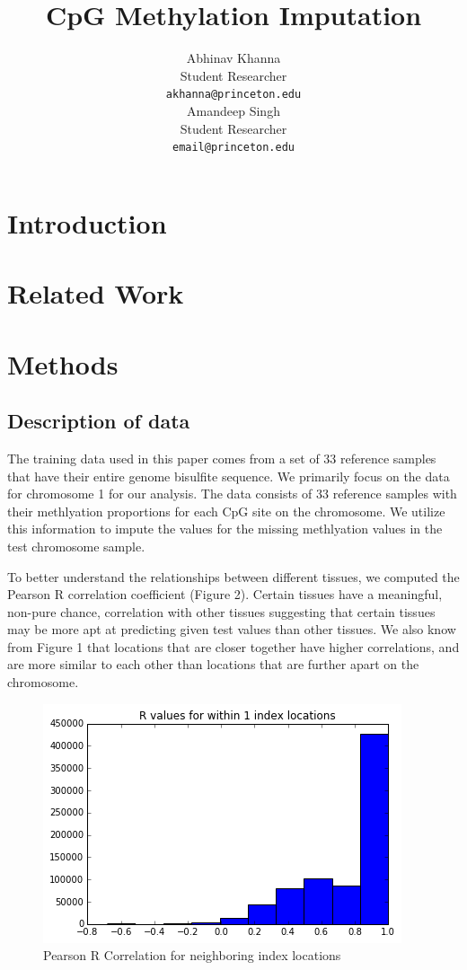 \documentclass{article} %
\title{CpG Methylation Imputation}
\author{
Abhinav Khanna\\
Student Researcher\\
\texttt{akhanna@princeton.edu} \\
\And
Amandeep Singh \\
Student Researcher \\
\texttt{email@princeton.edu} \\
}
\begin{document}
\maketitle

\begin{abstract}
\end{abstract}

\section{Introduction}


\section{Related Work}


\section{Methods}
\subsection{Description of data}
The training data used in this paper comes from a set of 33 reference samples that have their entire genome bisulfite sequence. We primarily focus on the data for chromosome 1 for our analysis. The data consists of 33 reference samples with their methlyation proportions for each CpG site on the chromosome. We utilize this information to impute the values for the missing methlyation values in the test chromosome sample.

To better understand the relationships between different tissues, we computed the Pearson R correlation coefficient (Figure 2). Certain tissues have a meaningful, non-pure chance, correlation with other tissues suggesting that certain tissues may be more apt at predicting given test values than other tissues. We also know from Figure 1 that locations that are closer together have higher correlations, and are more similar to each other than locations that are further apart on the chromosome.

\begin{figure}[!ht]
\begin{center}
\caption{Pearson R Correlation for neighboring index locations}
\begin{minipage}[b]{0.40\linewidth}
	\includegraphics[scale=0.40]{CorrelationByLocation.png}
\end{minipage}
\quad
\end{center}
\end{figure}
\end{document}
